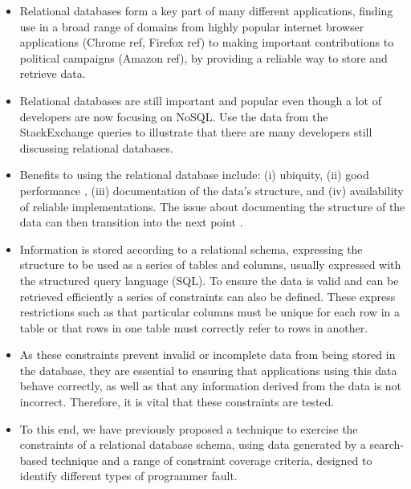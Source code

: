 \begin{itemize}

  \item Relational databases form a key part of many different applications, finding use in a broad range of domains from highly popular internet browser applications (Chrome ref, Firefox ref) to making important contributions to political campaigns (Amazon ref), by providing a reliable way to store and retrieve data.

  \item Relational databases are still important and popular even though a lot of developers are now focusing on NoSQL. Use the data from the StackExchange queries to illustrate that there are many developers still discussing relational databases.

  \item Benefits to using the relational database include: (i) ubiquity, (ii) good performance \cite{Abrahami2015}, (iii) documentation of the data's structure, and (iv) availability of reliable implementations. The issue about documenting the structure of the data can then transition into the next point .


  \item Information is stored according to a relational schema, expressing the structure to be used as a series of tables and columns, usually expressed with the structured query language (SQL). To ensure the data is valid and can be retrieved efficiently a series of constraints can also be defined. These express restrictions such as that particular columns must be unique for each row in a table or that rows in one table must correctly refer to rows in another.

  \item As these constraints prevent invalid or incomplete data from being stored in the database, they are essential to ensuring that applications using this data behave correctly, as well as that any information derived from the data is not incorrect. Therefore, it is vital that these constraints are tested.

  \item To this end, we have previously proposed a technique to exercise the constraints of a relational database schema, using data generated by a search-based technique and a range of constraint coverage criteria, designed to identify different types of programmer fault.


\end{itemize}
